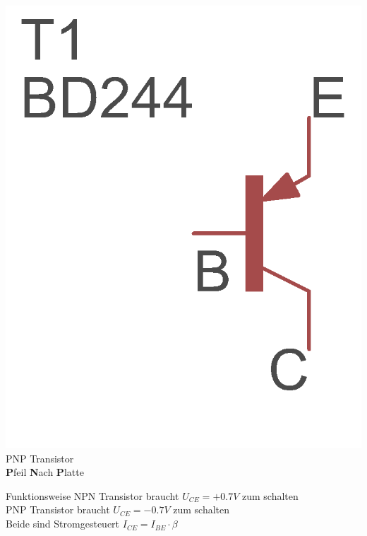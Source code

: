 \begin{frame}
\begin{minipage}{0.4\textwidth}
	\includegraphics[scale=1.4]{e13/PNP.png}\\
	PNP Transistor\\
    \textbf{P}feil \textbf{N}ach \textbf{P}latte
\end{minipage}

\begin{center}
\begin{block}{Funktionsweise}
NPN Transistor braucht $ U_{CE}=+0.7V$ zum schalten\\
PNP Transistor braucht $ U_{CE}=-0.7V$ zum schalten\\
Beide sind Stromgesteuert $I_{CE} = I_{BE} \cdot \beta$
\end{block}
\end{center}
\end{frame}

